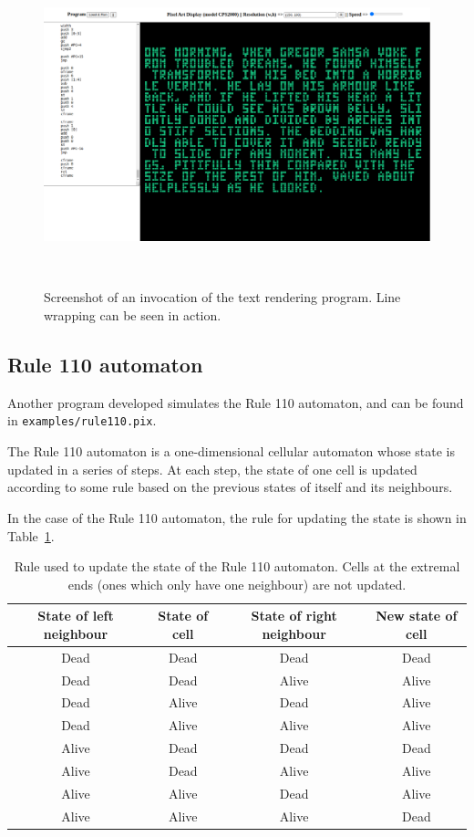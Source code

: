 \documentclass[11pt,a4paper]{scrartcl}
\begin{document}
\begin{figure}
  \centering
  \includegraphics[width=\textwidth]{text_render}
  \caption{Screenshot of an invocation of the text rendering program. Line wrapping can be seen in action.}~\label{fig:text-render}
\end{figure}

\subsection{Rule 110 automaton}

Another program developed simulates the Rule 110 automaton, and can be found in \verb|examples/rule110.pix|.

The Rule 110 automaton is a one-dimensional cellular automaton\cite{wolfram2002} whose state is updated in a series of steps. At each step, the state of one cell is updated according to some rule based on the previous states of itself and its neighbours.

In the case of the Rule 110 automaton, the rule for updating the state is shown in Table~\ref{tab:rule-110}.

\begin{table}[!h]
  \centering
  \begin{tabular}{|c|c|c|c|}
    \hline
    State of left neighbour & State of cell & State of right neighbour & New state of cell \\\hline\hline
    Dead & Dead & Dead & Dead \\ \hline
    Dead & Dead & Alive & Alive \\ \hline
    Dead & Alive & Dead & Alive \\ \hline
    Dead & Alive & Alive & Alive \\ \hline
    Alive & Dead & Dead & Dead \\ \hline
    Alive & Dead & Alive & Alive \\ \hline
    Alive & Alive & Dead & Alive \\ \hline
    Alive & Alive & Alive & Dead \\ \hline
  \end{tabular}
  \caption{Rule used to update the state of the Rule 110 automaton. Cells at the extremal ends (ones which only have one neighbour) are not updated.}~\label{tab:rule-110}
\end{table}
\end{document}
